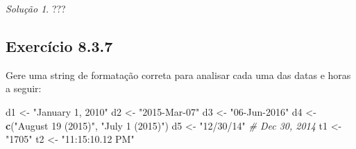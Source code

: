 \documentclass[
]{latex/krantz}
\newenvironment{Shaded}{\begin{snugshade}}{\end{snugshade}}
\newcommand{\CommentTok}[1]{\textcolor[rgb]{0.56,0.35,0.01}{\textit{#1}}}
\newcommand{\FunctionTok}[1]{\textcolor[rgb]{0.13,0.29,0.53}{\textbf{#1}}}
\newcommand{\NormalTok}[1]{#1}
\newcommand{\OtherTok}[1]{\textcolor[rgb]{0.56,0.35,0.01}{#1}}
\newcommand{\StringTok}[1]{\textcolor[rgb]{0.31,0.60,0.02}{#1}}
\theoremstyle{definition}
\theoremstyle{definition}
\theoremstyle{definition}
\theoremstyle{definition}
\theoremstyle{remark}
\newtheorem*{solution}{Solução}
\begin{document}
\begin{solution}
???
\end{solution}

\hypertarget{exr8-3-7}{%
\subsection*{Exercício 8.3.7}\label{exr8-3-7}}

Gere uma string de formatação correta para analisar cada uma das datas e horas a seguir:

\begin{Shaded}
\begin{Highlighting}[]
\NormalTok{d1 }\OtherTok{\textless{}{-}} \StringTok{"January 1, 2010"}
\NormalTok{d2 }\OtherTok{\textless{}{-}} \StringTok{"2015{-}Mar{-}07"}
\NormalTok{d3 }\OtherTok{\textless{}{-}} \StringTok{"06{-}Jun{-}2016"}
\NormalTok{d4 }\OtherTok{\textless{}{-}} \FunctionTok{c}\NormalTok{(}\StringTok{"August 19 (2015)"}\NormalTok{, }\StringTok{"July 1 (2015)"}\NormalTok{)}
\NormalTok{d5 }\OtherTok{\textless{}{-}} \StringTok{"12/30/14"} \CommentTok{\# Dec 30, 2014}
\NormalTok{t1 }\OtherTok{\textless{}{-}} \StringTok{"1705"}
\NormalTok{t2 }\OtherTok{\textless{}{-}} \StringTok{"11:15:10.12 PM"}
\end{Highlighting}
\end{Shaded}
\end{document}
